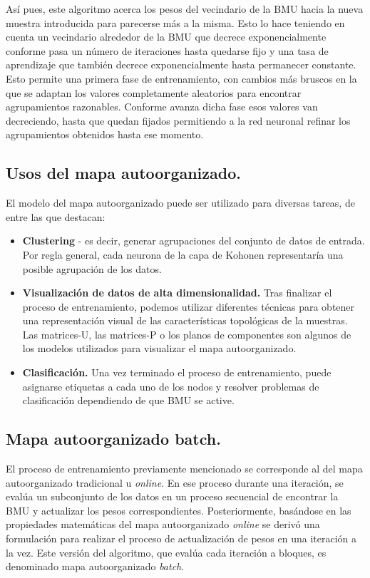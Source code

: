 Así pues, este algoritmo acerca los pesos del vecindario de la BMU hacia la nueva muestra introducida para parecerse más a la misma. Esto lo hace teniendo en cuenta un vecindario alrededor de la BMU que decrece exponencialmente conforme pasa un número de iteraciones hasta quedarse fijo y una tasa de aprendizaje que también decrece exponencialmente hasta permanecer constante. \\

Esto permite una primera fase de entrenamiento, con cambios más bruscos en la que se adaptan los valores completamente aleatorios para encontrar agrupamientos razonables. Conforme avanza dicha fase esos valores van decreciendo, hasta que quedan fijados permitiendo a la red neuronal refinar los agrupamientos obtenidos hasta ese momento.\\

\subsection{Usos del mapa autoorganizado.}
El modelo del mapa autoorganizado puede ser utilizado para diversas tareas, de entre las que destacan:

\begin{itemize}
	\item \textbf{Clustering} - es decir, generar agrupaciones del conjunto de datos de entrada. Por regla general, cada neurona de la capa de Kohonen representaría una posible agrupación de los datos. 

	\item \textbf{Visualización de datos de alta dimensionalidad.} Tras finalizar el proceso de entrenamiento, podemos utilizar diferentes técnicas para obtener una representación visual de las características topológicas de la muestras. Las matrices-U, las matrices-P o los planos de componentes son algunos de los modelos utilizados para visualizar el mapa autoorganizado.

	\item \textbf{Clasificación.} Una vez terminado el proceso de entrenamiento, puede asignarse etiquetas a cada uno de los nodos y resolver problemas de clasificación dependiendo de que BMU se active. 
	\end{itemize}

\subsection{Mapa autoorganizado batch.}
El proceso de entrenamiento previamente mencionado se corresponde al del mapa autoorganizado tradicional u \textit{online}. En ese proceso durante una iteración, se evalúa un subconjunto de los datos en un proceso secuencial de encontrar la BMU y actualizar los pesos correspondientes. Posteriormente, basándose en las propiedades matemáticas del mapa autoorganizado \textit{online} se derivó una formulación para realizar el proceso de actualización de pesos en una iteración a la vez. Este versión del algoritmo, que evalúa cada iteración a bloques, es denominado mapa autoorganizado \textit{batch}. \\

